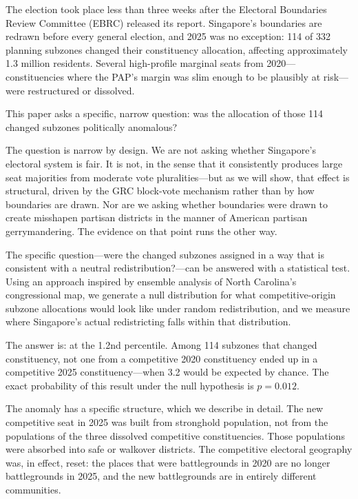 \documentclass[12pt]{article}
\begin{document}
The election took place less than three weeks after the Electoral Boundaries Review Committee
(EBRC) released its report. Singapore's boundaries are redrawn before every general election, and
2025 was no exception: 114 of 332 planning subzones changed their constituency allocation,
affecting approximately 1.3 million residents. Several high-profile marginal seats from
2020---constituencies where the PAP's margin was slim enough to be plausibly at risk---were
restructured or dissolved.

This paper asks a specific, narrow question: was the allocation of those 114 changed subzones
politically anomalous?

The question is narrow by design. We are not asking whether Singapore's electoral system is fair.
It is not, in the sense that it consistently produces large seat majorities from moderate vote
pluralities---but as we will show, that effect is structural, driven by the GRC block-vote
mechanism rather than by how boundaries are drawn. Nor are we asking whether boundaries were drawn
to create misshapen partisan districts in the manner of American partisan gerrymandering. The
evidence on that point runs the other way.

The specific question---were the changed subzones assigned in a way that is consistent with a
neutral redistribution?---can be answered with a statistical test. Using an approach inspired by
\citet{herschlag2020} ensemble analysis of North Carolina's congressional map, we generate a null
distribution for what competitive-origin subzone allocations would look like under random
redistribution, and we measure where Singapore's actual redistricting falls within that
distribution.

The answer is: at the 1.2nd percentile. Among 114 subzones that changed constituency, not one
from a competitive 2020 constituency ended up in a competitive 2025 constituency---when 3.2 would
be expected by chance. The exact probability of this result under the null hypothesis is $p =
0.012$.

The anomaly has a specific structure, which we describe in detail. The new competitive seat in
2025 was built from stronghold population, not from the populations of the three dissolved
competitive constituencies. Those populations were absorbed into safe or walkover districts. The
competitive electoral geography was, in effect, reset: the places that were battlegrounds in 2020
are no longer battlegrounds in 2025, and the new battlegrounds are in entirely different
communities.
\end{document}
